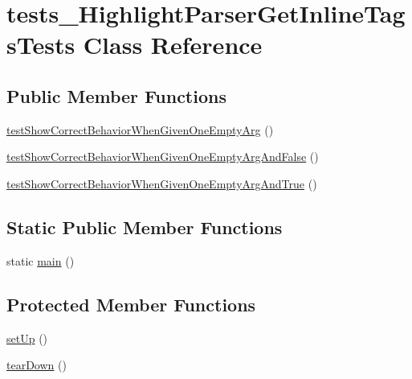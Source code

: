 \hypertarget{classtests___highlight_parser_get_inline_tags_tests}{\section{tests\-\_\-\-Highlight\-Parser\-Get\-Inline\-Tags\-Tests \-Class \-Reference}
\label{classtests___highlight_parser_get_inline_tags_tests}
}
\subsection*{\-Public \-Member \-Functions}
\begin{DoxyCompactItemize}
\item 
\hyperlink{classtests___highlight_parser_get_inline_tags_tests_a0b1684f30ad836be6b7de8bb953442f2}{test\-Show\-Correct\-Behavior\-When\-Given\-One\-Empty\-Arg} ()
\item 
\hyperlink{classtests___highlight_parser_get_inline_tags_tests_a33fd34fa76575b41982b0e71a205dd09}{test\-Show\-Correct\-Behavior\-When\-Given\-One\-Empty\-Arg\-And\-False} ()
\item 
\hyperlink{classtests___highlight_parser_get_inline_tags_tests_a73645b22b8888183b1da746439e62f04}{test\-Show\-Correct\-Behavior\-When\-Given\-One\-Empty\-Arg\-And\-True} ()
\end{DoxyCompactItemize}
\subsection*{\-Static \-Public \-Member \-Functions}
\begin{DoxyCompactItemize}
\item 
static \hyperlink{classtests___highlight_parser_get_inline_tags_tests_a36f43c36e6b3288e6bfb8244ce59073e}{main} ()
\end{DoxyCompactItemize}
\subsection*{\-Protected \-Member \-Functions}
\begin{DoxyCompactItemize}
\item 
\hyperlink{classtests___highlight_parser_get_inline_tags_tests_a0bc688732d2b3b162ffebaf7812e78da}{set\-Up} ()
\item 
\hyperlink{classtests___highlight_parser_get_inline_tags_tests_a80fe3d17e658907fc75346a0ec9d6fc7}{tear\-Down} ()
\end{DoxyCompactItemize}


